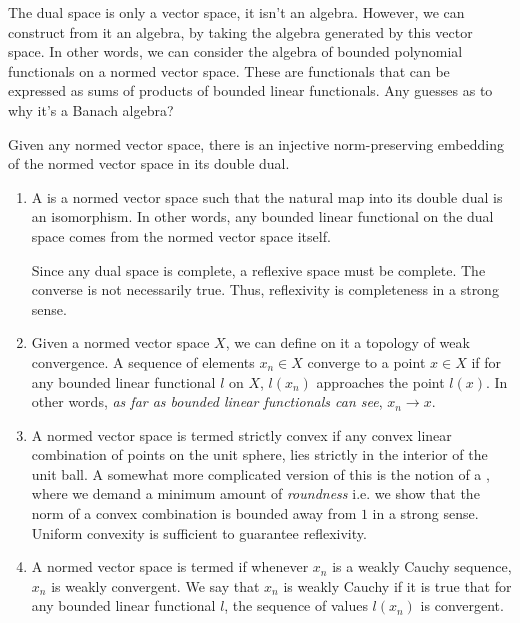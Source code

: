 \documentclass[a4paper]{amsart}
\begin{document}
The dual space is only a vector space, it isn't an algebra. However,
we can construct from it an algebra, by taking the algebra generated
by this vector space. In other words, we can consider the algebra of
bounded polynomial functionals on a normed vector space. These are
functionals that can be expressed as sums of products of bounded
linear functionals. Any guesses as to why it's a Banach algebra?

Given any normed vector space, there is an injective norm-preserving
embedding of the normed vector space in its double dual.

\begin{definer}

  \begin{enumerate}

  \item A  is a normed vector space
    such that the natural map into its double dual is an
    isomorphism. In other words, any bounded linear functional on the dual
    space comes from the normed vector space itself.

    Since any dual space is complete, a reflexive space must be
    complete.  The converse is not necessarily true. Thus, reflexivity
    is completeness in a strong sense.

  \item Given a normed vector space $X$, we can define on it a
    topology of weak convergence. A sequence of elements $x_n \in X$
    converge to a point $x \in X$ if for any bounded linear functional
    $l$ on $X$, $l(x_n)$ approaches the point $l(x)$. In other words,
    {\em as far as bounded linear functionals can see}, $x_n \to x$.

  \item A normed vector space is termed 
    {strictly convex} if any convex linear combination of points on
    the unit sphere, lies strictly in the interior of the unit ball.
    A somewhat more complicated version of this is the notion of a
    , where we demand a
    minimum amount of {\em roundness} i.e. we show that the norm of a
    convex combination is bounded away from $1$ in a strong
    sense. Uniform convexity is sufficient to guarantee reflexivity.
  \item A normed vector space is termed
     if whenever $x_n$ is a
    weakly Cauchy sequence, $x_n$ is weakly convergent. We say that
    $x_n$ is weakly Cauchy if it is true that for any bounded linear
    functional $l$, the sequence of values $l(x_n)$ is convergent.

  \end{enumerate}

\end{definer}
\end{document}
